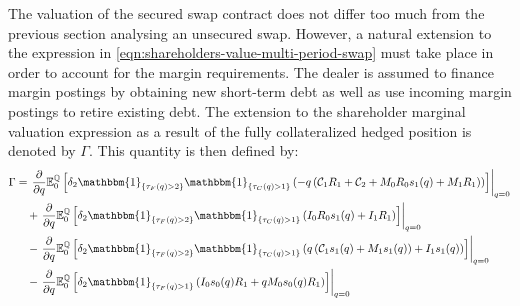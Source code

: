 \documentclass[main.tex]{subfiles}
\begin{document}
        The valuation of the secured swap contract does not differ too much from the previous section analysing an unsecured swap.
        However, a natural extension to the expression in \cref{eqn:shareholders-value-multi-period-swap}
        must take place in order to account for the margin requirements.
        The dealer is assumed to finance margin postings by obtaining new short-term debt
        as well as use incoming margin postings to retire existing debt.
        The extension to the shareholder marginal valuation expression
        as a result of the fully collateralized hedged position is denoted by $\Gamma$.
        This quantity is then defined by:
        \begin{align}
            \Gamma &=
            \left.\frac{\partial}{\partial q}
            \mathbb{E}_{0}^{\rnmeasure}\left[
                \delta_2 \mathbbm{1}_{\{\tau_{F}(q)>2\}}
                \mathbbm{1}_{\{\tau_{C}(q)>1\}}
                \left(
                    - q\left(\mathcal{C}_1 R_1 + \mathcal{C}_2
                    + M_0 R_0 s_1(q)
                    + M_1 R_1\right)
                \right) 
            \right]\right\rvert_{q=0}
            \nonumber
            \\
            &\quad+
            \left.\frac{\partial}{\partial q}
            \mathbb{E}_{0}^{\rnmeasure}\left[
                \delta_2 \mathbbm{1}_{\{\tau_{F}(q)>2\}}
                \mathbbm{1}_{\{\tau_{C}(q)>1\}}
                \left(
                    I_0 R_0 s_1(q)
                    + I_1 R_1
                \right) 
            \right]\right\rvert_{q=0}
            \nonumber
            \\
            &\quad-
            \left.\frac{\partial}{\partial q}
            \mathbb{E}_{0}^{\rnmeasure}\left[
                \delta_2 \mathbbm{1}_{\{\tau_{F}(q)>2\}}
                \mathbbm{1}_{\{\tau_{C}(q)>1\}}
                \left(
                    q\left(\mathcal{C}_{1} s_{1}(q)
                    + M_1 s_{1}(q)\right)
                    + I_1 s_{1}(q)
                \right)
            \right]\right\rvert_{q=0}
            \nonumber
            \\
            &\quad-
            \left.\frac{\partial}{\partial q}
            \mathbb{E}_{0}^{\rnmeasure}\left[
                \delta_2 \mathbbm{1}_{\{\tau_{F}(q)>1\}}
                \left(
                    I_0 s_{0}(q) R_{1}
                    + qM_0 s_{0}(q) R_{1}
                \right) 
            \right]\right\rvert_{q=0}
            \label{eqn:sharholders-value-hedged-swap-step-1}
        \end{align}
\end{document}
